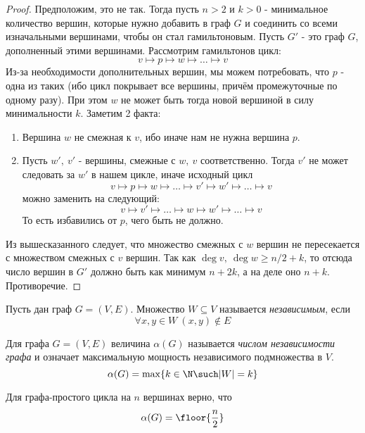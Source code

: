 \begin{proof}
	Предположим, это не так. Тогда пусть $n > 2$ и $k > 0$ - минимальное количество вершин, которые нужно добавить в граф $G$ и соединить со всеми изначальными вершинами, чтобы он стал гамильтоновым. Пусть $G'$ - это граф $G$, дополненный этими вершинами. Рассмотрим гамильтонов цикл:
	\[
		v \mapsto p \mapsto w \mapsto \ldots \mapsto v
	\]
	Из-за необходимости дополнительных вершин, мы можем потребовать, что $p$ - одна из таких (ибо цикл покрывает все вершины, причём промежуточные по одному разу). При этом $w$ не может быть тогда новой вершиной в силу минимальности $k$. Заметим 2 факта:
	\begin{enumerate}
		\item Вершина $w$ не смежная к $v$, ибо иначе нам не нужна вершина $p$.
		
		\item Пусть $w',\ v'$ - вершины, смежные с $w,\ v$ соответственно. Тогда $v'$ не может следовать за $w'$ в нашем цикле, иначе исходный цикл
		\[
			v \mapsto p \mapsto w \mapsto \ldots \mapsto v' \mapsto w' \mapsto \ldots \mapsto v
		\]
		можно заменить на следующий:
		\[
			v \mapsto v' \mapsto \ldots \mapsto w \mapsto w' \mapsto \ldots \mapsto v
		\]
		То есть избавились от $p$, чего быть не должно.
	\end{enumerate}
	Из вышесказанного следует, что множество смежных с $w$ вершин не пересекается с множеством смежных с $v$ вершин. Так как $\deg v,\ \deg w \ge n/2 + k$, то отсюда число вершин в $G'$ должно быть как минимум $n + 2k$, а на деле оно $n + k$. Противоречие.
\end{proof}

\begin{definition}
	Пусть дан граф $G = (V, E)$. Множество $W \subseteq V$ называется \textit{независимым}, если
	\[
		\forall x, y \in W\ (x, y) \notin E
	\]
\end{definition}

\begin{definition}
	Для графа $G = (V, E)$ величина $\alpha(G)$ называется \textit{числом независимости графа} и означает максимальную мощность независимого подмножества в $V$.
	\[
		\alpha(G) = \max \{k \in \N \such |W| = k\}
	\]
\end{definition}

\begin{example}
	Для графа-простого цикла на $n$ вершинах верно, что
	\[
		\alpha(G) = \floor{\frac{n}{2}}
	\]
\end{example}

